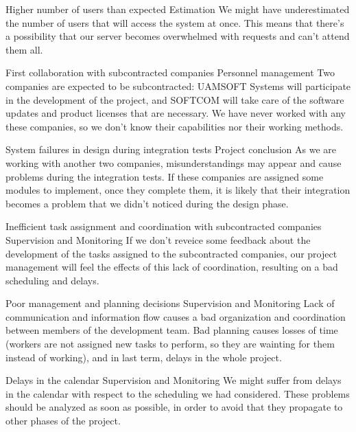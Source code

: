\begin{risk}{Higher number of users than expected}
\riskcat Estimation
\riskdesc We might have underestimated the number of users that will access the system at once. This means that there's a possibility that our server becomes overwhelmed with requests and can't attend them all.
\end{risk}

\begin{risk}{First collaboration with subcontracted companies}
\riskcat Personnel management
\riskdesc Two companies are expected to be subcontracted: UAMSOFT Systems will participate in the development of the project, and SOFTCOM will take care of the software updates and product licenses that are necessary. We have never worked with any these companies, so we don't know their capabilities nor their working methods.
\end{risk}

\begin{risk}{System failures in design during integration tests}
\riskcat Project conclusion
\riskdesc As we are working with another two companies, misunderstandings may appear and cause problems during the integration tests. If these companies are assigned some modules to implement, once they complete them, it is likely that their integration becomes a problem that we didn't noticed during the design phase.
\end{risk}

\begin{risk}{Inefficient task assignment and coordination with subcontracted companies}
\riskcat Supervision and Monitoring
\riskdesc If we don't reveice some feedback about the development of the tasks assigned to the subcontracted companies, our project management will feel the effects of this lack of coordination, resulting on a bad scheduling and delays.
\end{risk}

\begin{risk}{Poor management and planning decisions}
\riskcat Supervision and Monitoring
\riskdesc Lack of communication and information flow causes a bad organization and coordination between members of the development team. Bad planning causes losses of time (workers are not assigned new tasks to perform, so they are wainting for them instead of working), and in last term, delays in the whole project. 
\end{risk}

\begin{risk}{Delays in the calendar}
\riskcat Supervision and Monitoring
\riskdesc We might suffer from delays in the calendar with respect to the scheduling we had considered. These problems should be analyzed as soon as possible, in order to avoid that they propagate to other phases of the project.
\end{risk}

